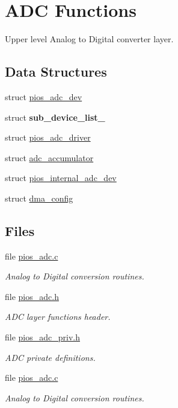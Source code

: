 \hypertarget{group___p_i_o_s___a_d_c}{\section{\-A\-D\-C \-Functions}
\label{group___p_i_o_s___a_d_c}
}


\-Upper level \-Analog to \-Digital converter layer.  


\subsection*{\-Data \-Structures}
\begin{DoxyCompactItemize}
\item 
struct \hyperlink{structpios__adc__dev}{pios\-\_\-adc\-\_\-dev}
\item 
struct {\bfseries sub\-\_\-device\-\_\-list\-\_\-}
\item 
struct \hyperlink{structpios__adc__driver}{pios\-\_\-adc\-\_\-driver}
\item 
struct \hyperlink{structadc__accumulator}{adc\-\_\-accumulator}
\item 
struct \hyperlink{structpios__internal__adc__dev}{pios\-\_\-internal\-\_\-adc\-\_\-dev}
\item 
struct \hyperlink{structdma__config}{dma\-\_\-config}
\end{DoxyCompactItemize}
\subsection*{\-Files}
\begin{DoxyCompactItemize}
\item 
file \hyperlink{pios__adc_8c}{pios\-\_\-adc.\-c}
\begin{DoxyCompactList}\small\item\em \-Analog to \-Digital conversion routines. \end{DoxyCompactList}\item 
file \hyperlink{pios__adc_8h}{pios\-\_\-adc.\-h}
\begin{DoxyCompactList}\small\item\em \-A\-D\-C layer functions header. \end{DoxyCompactList}\item 
file \hyperlink{pios__adc__priv_8h}{pios\-\_\-adc\-\_\-priv.\-h}
\begin{DoxyCompactList}\small\item\em \-A\-D\-C private definitions. \end{DoxyCompactList}\item 
file \hyperlink{pios__adc_8c}{pios\-\_\-adc.\-c}
\begin{DoxyCompactList}\small\item\em \-Analog to \-Digital conversion routines. \end{DoxyCompactList}\end{DoxyCompactItemize}
